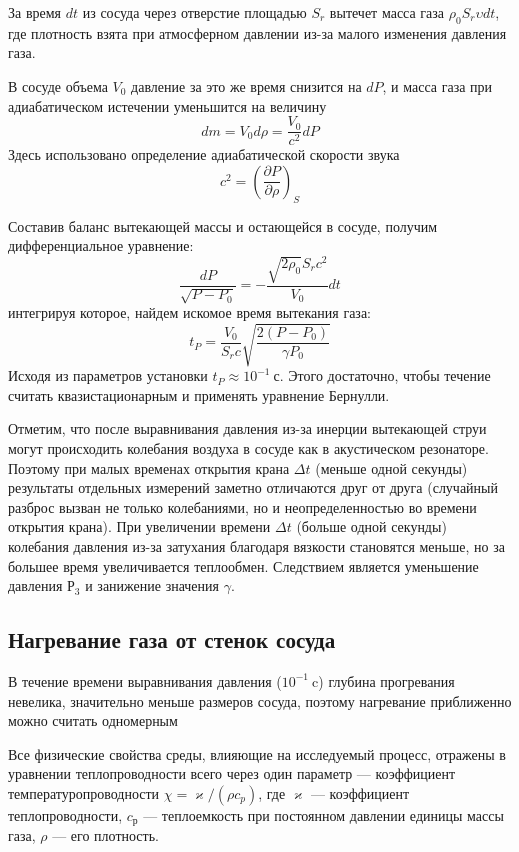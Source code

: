 \documentclass[a4paper,12pt]{article}
\theoremstyle{plain} %
\theoremstyle{definition} %
\theoremstyle{remark} %
\begin{document}
За время $dt$ из сосуда через отверстие площадью $S_r$ вытечет масса газа $\rho_0 S_r \upsilon dt$, где плотность взята при атмосферном давлении из-за малого изменения давления газа.

В сосуде объема $V_0$ давление за это же время снизится на $dP$, и масса газа при адиабатическом истечении уменьшится на величину
\[dm = V_0 d\rho = \frac{V_0}{c^2}dP\]
Здесь использовано определение адиабатической скорости звука
\[c^2 = \left(\frac{\partial P}{\partial \rho} \right)_S \]

Составив баланс вытекающей массы и остающейся в сосуде, получим дифференциальное уравнение:
\[ \frac{dP}{\sqrt{P - P_0}} = -\frac{\sqrt{2\rho_0}S_r c^2}{V_0}dt \]
интегрируя которое, найдем искомое время вытекания газа:
\[t_P = \frac{V_0}{S_r c}\sqrt{\frac{2(P - P_0)}{\gamma P_0}}\]
Исходя из параметров установки $t_P \approx 10^{-1}\ \text{с}$. Этого достаточно, чтобы течение считать квазистационарным и применять уравнение Бернулли.

Отметим, что после выравнивания давления из-за инерции вытекающей струи могут происходить колебания воздуха в сосуде как в акустическом резонаторе. Поэтому при малых временах открытия крана $\Delta t$ (меньше одной секунды) результаты отдельных измерений заметно отличаются друг от друга (случайный разброс вызван не только колебаниями, но и неопределенностью во времени открытия крана). При увеличении времени $\Delta t$ (больше одной секунды) колебания давления из-за затухания благодаря вязкости становятся меньше, но за большее время увеличивается теплообмен. Следствием является уменьшение давления $Р_3$ и занижение значения $\gamma$.

\subsection{Нагревание газа от стенок сосуда}
В течение времени выравнивания давления ($10^{-1}\ \text{c}$) глубина прогревания невелика, значительно меньше размеров сосуда, поэтому нагревание приближенно можно считать одномерным

Все физические свойства среды, влияющие на исследуемый процесс, отражены в уравнении теплопроводности всего через один параметр — коэффициент температуропроводности $\chi = \varkappa/(\rho c_p)$, где $\varkappa$ — коэффициент теплопроводности, $c_р$ — теплоемкость при постоянном давлении единицы массы газа, $\rho$ — его плотность.
\end{document}
